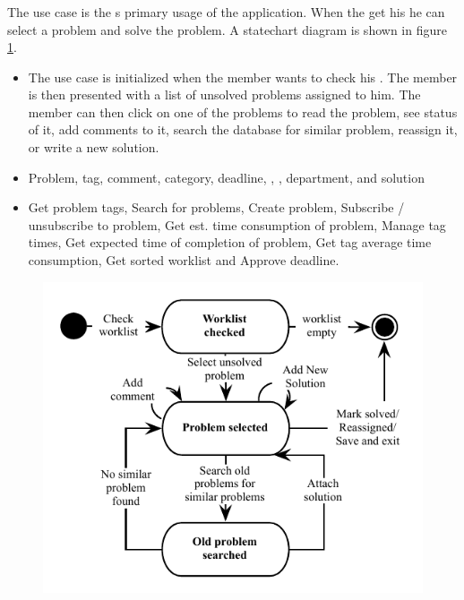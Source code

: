 \subsubsection{\ucsolproblem[c]} The use case \ucsolproblem{} is the \astaff{}s primary usage of the application. When the \astaff[] get his \todolist[] he can select a problem and solve the problem. A statechart diagram is shown in figure \ref{fig:solve_problem_use_case}.

\begin{itemize}
\item {} The use case is initialized when the \astaff[] member wants to check his \todolist[]. The \astaff[] member is then presented with a list of unsolved problems assigned to him. The \astaff[] member can then click on one of the problems to read the problem, see status of it, add comments to it, search the database for similar problem, reassign it, or write a new solution. 

\item {} Problem, tag, comment, category, deadline, \client[], \staff[], department, and solution

\item {} Get problem tags, Search for problems, Create problem, Subscribe / unsubscribe to problem, Get est. time consumption of problem, Manage tag times, Get expected time of completion of problem, Get tag average time consumption, Get sorted worklist and Approve deadline. 
\end{itemize}

\begin{figure}[htbp]
\begin{center}
 \includegraphics[scale=0.8]{input/application_domain_analysis/solve_problem_use_case}
\label{fig:solve_problem_use_case}
\end{center}
\end{figure}

